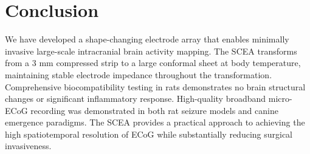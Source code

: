 \documentclass[11pt]{article}
\begin{document}
\section{Conclusion}

We have developed a shape-changing electrode array that enables minimally invasive large-scale intracranial brain activity mapping. The SCEA transforms from a 3 mm compressed strip to a large conformal sheet at body temperature, maintaining stable electrode impedance throughout the transformation. Comprehensive biocompatibility testing in rats demonstrates no brain structural changes or significant inflammatory response. High-quality broadband micro-ECoG recording was demonstrated in both rat seizure models and canine emergence paradigms. The SCEA provides a practical approach to achieving the high spatiotemporal resolution of ECoG while substantially reducing surgical invasiveness.



\end{document}

